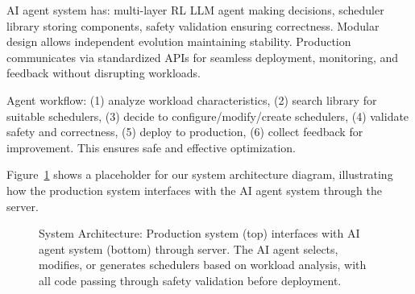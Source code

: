 AI agent system has: multi-layer RL LLM agent making decisions, scheduler library storing components, safety validation ensuring correctness. Modular design allows independent evolution maintaining stability. Production communicates via standardized APIs for seamless deployment, monitoring, and feedback without disrupting workloads.

Agent workflow: (1) analyze workload characteristics, (2) search library for suitable schedulers, (3) decide to configure/modify/create schedulers, (4) validate safety and correctness, (5) deploy to production, (6) collect feedback for improvement. This ensures safe and effective optimization.

Figure~\ref{fig:architecture} shows a placeholder for our system architecture diagram, illustrating how the production system interfaces with the AI agent system through the \sys server.

\begin{figure}[h]
\centering
{}
\caption{System Architecture: Production system (top) interfaces with AI agent system (bottom) through \sys server. The AI agent selects, modifies, or generates schedulers based on workload analysis, with all code passing through safety validation before deployment.}
\label{fig:architecture}
\end{figure}